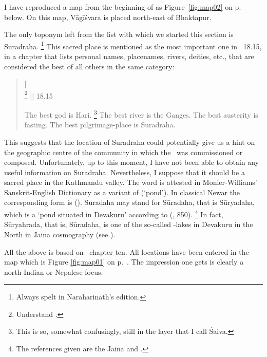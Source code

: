 \noindent
I have reproduced a map from the beginning of 
 as Figure~\ref{fig:map02}
on p.~\pageref{fig:map02} below. On this map, Vāgīśvara is placed north-east 
of Bhaktapur. 

The only toponym left from the list with which
we started this section is Suradraha.%
	\footnote{Always spelt  in Naraharinath's
			edition.}
This sacred place is mentioned as the most important
one in \VSS\ 18.15, in a chapter that lists personal names,
placenames, rivers, deities, etc., that are considered the
best  of all others in the same category:

\begin{quote}
 |\\
%
                \footnote{Understand .}
                          || 18.15 

The best god is Hari.%
		\footnote{This is so, somewhat confusingly, still in the
		layer that I call Śaiva.}
The best river is the Ganges.
The best austerity is fasting. The best pilgrimage-place is Suradraha.
\end{quote}

\noindent
This suggests that the location of Suradraha could potentially
give us a hint on the geographic centre of 
the community in which the \VSS\ was commissioned
or composed. Unfortunately, up to this moment, I have
not been able to obtain any useful information on Suradraha. Nevertheless,
I suppose that it should be  a sacred place in the 
Kathmandu valley. The word  is attested in
Monier-Williams' Sanskrit-English Dictionary 
as a variant of  (`pond').
In classical Newar the corresponding form is 
(). Suradaha may stand for Sūradaha,
that is Sūryadaha, which is a `pond situated in Devakuru' 
according to \citeauthor{PrakritProperNames2} (\citeyear{PrakritProperNames2}, 850).%
	\footnote{The references given are the Jaina 
			 and .} 
In fact, Sūryahrada, that is, Sūradaha, is one of the 
so-called -lakes in Devakuru in the North
in Jaina cosmography (see ).
 
All the above is based on \VSS\ chapter ten. All locations have
 been entered in the map which is Figure \ref{fig:map01} on
 p.~\pageref{fig:map01}.
 The impression one gets is clearly a north-Indian or
 Nepalese focus.
 
